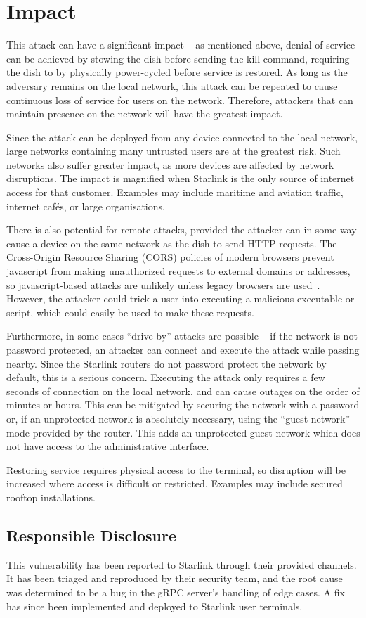 \section{Impact}\label{sec:impact}

This attack can have a significant impact -- as mentioned above, denial of service can be achieved by stowing the dish before sending the kill command, requiring the dish to by physically power-cycled before service is restored.
As long as the adversary remains on the local network, this attack can be repeated to cause continuous loss of service for users on the network.
Therefore, attackers that can maintain presence on the network will have the greatest impact.

Since the attack can be deployed from any device connected to the local network, large networks containing many untrusted users are at the greatest risk.
Such networks also suffer greater impact, as more devices are affected by network disruptions.
The impact is magnified when Starlink is the only source of internet access for that customer.
Examples may include maritime and aviation traffic, internet cafés, or large organisations.

There is also potential for remote attacks, provided the attacker can in some way cause a device on the same network as the dish to send HTTP requests.
The Cross-Origin Resource Sharing (CORS) policies of modern browsers prevent javascript from making unauthorized requests to external domains or addresses, so javascript-based attacks are unlikely unless legacy browsers are used~\cite{cors}.
However, the attacker could trick a user into executing a malicious executable or script, which could easily be used to make these requests.

Furthermore, in some cases ``drive-by'' attacks are possible -- if the network is not password protected, an attacker can connect and execute the attack while passing nearby.
Since the Starlink routers do not password protect the network by default, this is a serious concern.
Executing the attack only requires a few seconds of connection on the local network, and can cause outages on the order of minutes or hours.
This can be mitigated by securing the network with a password or, if an unprotected network is absolutely necessary, using the ``guest network'' mode provided by the router.
This adds an unprotected guest network which does not have access to the administrative interface.

Restoring service requires physical access to the terminal, so disruption will be increased where access is difficult or restricted.
Examples may include secured rooftop installations.


\subsection{Responsible Disclosure}\label{sec:responsible-disclosure}

This vulnerability has been reported to Starlink through their provided channels.
It has been triaged and reproduced by their security team, and the root cause was determined to be a bug in the gRPC server's handling of edge cases.
A fix has since been implemented and deployed to Starlink user terminals.
